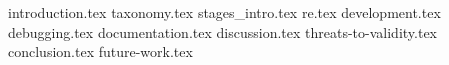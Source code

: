 {introduction.tex}
{taxonomy.tex}
{stages_intro.tex}
{re.tex}
{development.tex}
{debugging.tex}
{documentation.tex}
{discussion.tex}
{threats-to-validity.tex}
{conclusion.tex}
{future-work.tex}